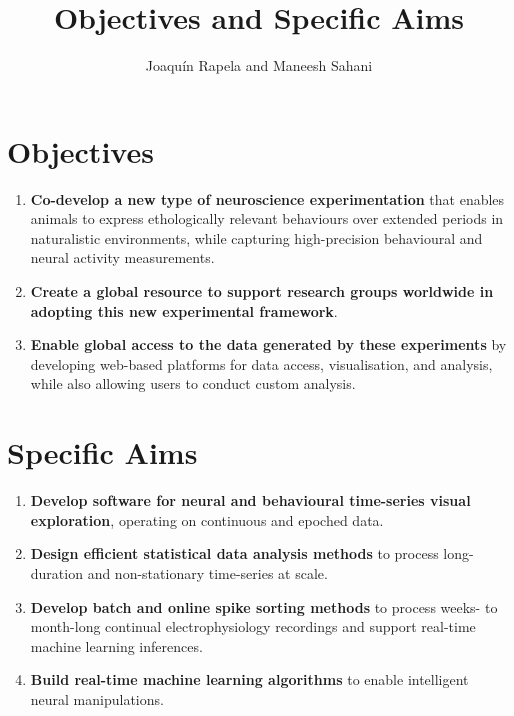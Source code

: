 \documentclass{article}
\title{Objectives and Specific Aims}
\author{Joaqu\'{i}n Rapela and Maneesh Sahani}
\begin{document}
\maketitle

\section{Objectives}

\begin{enumerate}

    \item \textbf{Co-develop a new type of neuroscience experimentation}
        that enables animals to express ethologically relevant behaviours
        over extended periods in naturalistic environments, while capturing
        high-precision behavioural and neural activity measurements.


    \item \textbf{Create a global resource to support research groups worldwide
        in adopting this new experimental framework}.

    \item \textbf{Enable global access to the data generated by these
        experiments} by developing web-based platforms for data access,
        visualisation, and analysis, while also allowing users to conduct
        custom analysis.

\end{enumerate}

\section{Specific Aims}

\begin{enumerate}

    \item \textbf{Develop software for neural and behavioural time-series
        visual exploration}, operating on continuous and epoched data.

    \item \textbf{Design efficient statistical data analysis methods} to
        process long-duration and non-stationary time-series at scale.

    \item \textbf{Develop batch and online spike sorting methods} to
        process weeks- to month-long continual electrophysiology recordings
        and support real-time machine learning inferences.

    \item \textbf{Build real-time machine learning algorithms} to
        enable intelligent neural manipulations.

\end{enumerate}
\end{document}
